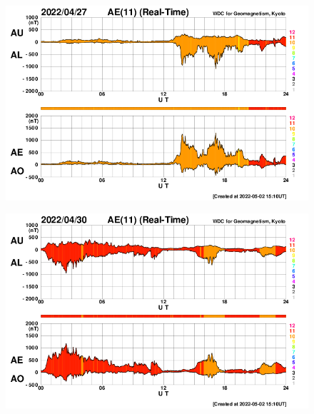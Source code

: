 \documentclass[11pt, oneside]{article}
\begin{document}
                     \begin{figure}[H]
    
                        \centering
   
                             \includegraphics[width=14cm]{./figures/figureGeomag_2.png}

                        \end{figure}

                     \begin{figure}[H]
    
                        \centering
   
                             \includegraphics[width=14cm]{./figures/figureGeomag_3.png}

                        \end{figure}
\end{document}
